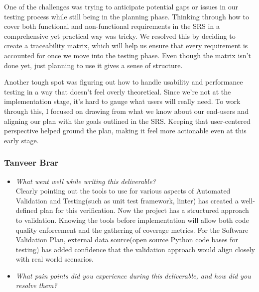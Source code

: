 \documentclass[12pt, titlepage]{article}
\begin{document}
\begin{appendices}
\begin{itemize}
        One of the challenges was trying to anticipate potential gaps or issues
        in our testing process while still being in the planning phase. Thinking
        through how to cover both functional and non-functional requirements in
        the SRS in a comprehensive yet practical way was tricky. We
        resolved this
        by deciding to create a traceability matrix, which will help
        us ensure that
        every requirement is accounted for once we move into the
        testing phase. Even
        though the matrix isn’t done yet, just planning to use it gives a sense
        of structure.

        Another tough spot was figuring out how to handle usability
        and performance
        testing in a way that doesn’t feel overly theoretical. Since
        we’re not at the
        implementation stage, it’s hard to gauge what users will
        really need. To work
        through this, I focused on drawing from what we know about
        our end-users and
        aligning our plan with the goals outlined in the SRS. Keeping
        that user-centered
        perspective helped ground the plan, making it feel more
        actionable even at this
        early stage.
    \end{itemize}

    \subsubsection*{Tanveer Brar}
    \begin{itemize}
      \item \textit{What went well while writing this deliverable?} \\

        Clearly pointing out the tools to use for various aspects of
        Automated Validation and Testing(such as unit test framework,
        linter) has created a well-defined plan for this
        verification. Now the project has a structured approach to
        validation. Knowing the tools before implementation will
        allow both code quality enforcement and the gathering of
        coverage metrics. For the Software Validation Plan, external
        data source(open source Python code bases for testing) has
        added confidence that the validation approach would align
        closely with real world scenarios.

      \item \textit{What pain points did you experience during this
        deliverable, and how did you resolve them?}\\


\end{itemize}
\end{appendices}
\end{document}
